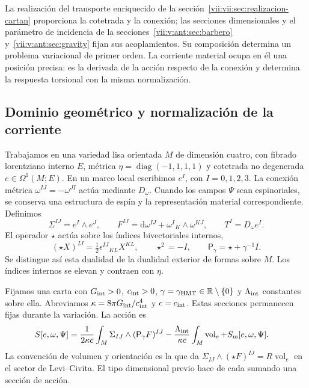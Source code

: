 La realización del transporte enriquecido de la
sección~\ref{vii:vii:sec:realizacion-cartan} proporciona la cotetrada y la
conexión; las secciones dimensionales y el parámetro de incidencia de la
secciones~\ref{vii:v:ant:sec:barbero} y~\ref{vii:v:ant:sec:gravity} fijan sus acoplamientos. Su composición
determina un problema variacional de primer orden. La corriente material
ocupa en él una posición precisa: es la derivada de la acción respecto de
la conexión y determina la respuesta torsional con la misma normalización.

\subsection{Dominio geométrico y normalización de la corriente}
\label{vii:vii:subsec:dominio-corriente-cartan}

Trabajamos en una variedad lisa orientada \(M\) de dimensión cuatro,
con fibrado lorentziano interno \(E\), métrica
\(\eta=\operatorname{diag}(-1,1,1,1)\) y cotetrada no degenerada
\(e\in\Omega^1(M;E)\). En un marco local escribimos
\(e^I\), con \(I=0,1,2,3\). La conexión métrica
\(\omega^{IJ}=-\omega^{JI}\) actúa mediante \(D_\omega\).
Cuando los campos \(\Psi\) sean espinoriales, se conserva una estructura
de espín y la representación material correspondiente. Definimos
\begin{equation}
 \Sigma^{IJ}=e^I\wedge e^J,\qquad
 F^{IJ}=\mathrm d\omega^{IJ}+\omega^I{}_{K}\wedge\omega^{KJ},
 \qquad T^I=D_\omega e^I.
 \label{vii:vii:eq:campos-cartan}
\end{equation}
El operador \(\star\) actúa sobre los índices bivectoriales internos,
\begin{equation}
 (\star X)^{IJ}=\tfrac12\epsilon^{IJ}{}_{KL}X^{KL},
 \qquad \star^2=-I,\qquad
 \mathsf P_\gamma=\star+\gamma^{-1}I.
 \label{vii:vii:eq:operador-holst}
\end{equation}
Se distingue así esta dualidad de la dualidad exterior de formas sobre
\(M\). Los índices internos se elevan y contraen con \(\eta\).

Fijamos una carta con \(G_{\rm int}>0\), \(c_{\rm int}>0\),
\(\gamma=\gamma_{\rm HMT}\in\mathbb R\setminus\{0\}\) y
\(\Lambda_{\rm int}\) constantes sobre ella. Abreviamos
\(\kappa=8\pi G_{\rm int}/c_{\rm int}^4\) y \(c=c_{\rm int}\).
Estas secciones permanecen fijas durante la variación. La acción es
\begin{equation}
 \begin{split}
 S[e,\omega,\Psi]={}&
 \frac1{2\kappa c}\int_M\Sigma_{IJ}\wedge
                         (\mathsf P_\gamma F)^{IJ}
 -\frac{\Lambda_{\rm int}}{\kappa c}
                         \int_M\operatorname{vol}_e
 +S_{\rm m}[e,\omega,\Psi].
 \end{split}
 \label{vii:vii:eq:accion-cartan-holst}
\end{equation}
La convención de volumen y orientación es la que da
\(\Sigma_{IJ}\wedge(\star F)^{IJ}=R\operatorname{vol}_e\)
en el sector de Levi--Civita. El tipo dimensional previo hace de cada
sumando una sección de acción.

